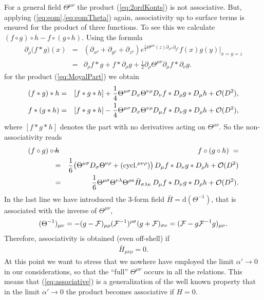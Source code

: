 \documentclass[a4paper,12pt]{article}
\newcommand {\ud} {\mathrm{d}}
\newcommand {\cF} {{\cal F}}
\newcommand {\cO}{{\cal O}}
\newcommand {\Back}{\!\!\!\!\!}
\begin{document}
For a general field $\Theta^{\mu\nu}$ the product (\ref{eq:2ordKonts})
is not associative. But, applying (\ref{eq:eom},\ref{eq:eomTheta})  again,
associativity up to surface terms is ensured for the product of three 
functions. To see this we calculate $(f\circ g)\circ h-f\circ (g\circ h)$.
%
Using the formula 
\begin{eqnarray}
  \label{eq:diffMoyal}
  \partial_\rho \bigl(f*g\bigr)(x) &=& 
  (\partial_{x^\rho} + \partial_{y^\rho} + \partial_{z^\rho})
  e^{\frac i2 \Theta^{\mu\nu}(z) \partial_{x^\mu}\partial_{y^\nu}} 
            f(x) g(y)\Bigr\vert_{x=y=z} \nonumber\\
  &=& \partial_\rho f * g + f * \partial_\rho g + 
  \frac i2 \partial_\rho \Theta^{\mu\nu}\partial_\mu f * \partial_\nu g.
\end{eqnarray}
for the product (\ref{eq:MoyalPart}) we obtain
\begin{eqnarray}
  \label{starnonassoc}
  (f * g) * h &=& [f*g*h] + 
                \frac 14 \Theta^{\mu\sigma} D_\sigma \Theta^{\nu\rho}
                D_\nu f * D_\rho g * D_\mu h + \cO(D^2),\nonumber\\
  f * (g * h) &=& [f*g*h] - 
                \frac 14 \Theta^{\mu\sigma} D_\sigma \Theta^{\nu\rho}
                D_\mu f * D_\nu g * D_\rho h + \cO(D^2),
\end{eqnarray}
where $[f*g*h]$ denotes the part with no derivatives acting on 
$\Theta^{\mu\nu}$. So the non-associativity reads
\begin{eqnarray}
  \label{eq:nonassoc}
  (f \circ g) \circ h \Back&-&\Back f \circ (g \circ h) \; = \nonumber\\
  &=& \frac{1}{6} \bigl( \Theta^{\mu\sigma}  D_\sigma \Theta^{\nu\rho} +  
     (\textrm{cycl.}{}^{\mu\nu\rho}) \bigr) \, %
     D_\mu f * D_\nu g * D_\rho h + \cO(D^2) \nonumber\\
  &=& \frac{1}{6} 
     \Theta^{\mu\sigma} \Theta^{\nu\lambda} \Theta^{\rho\kappa}
     \bar H_{\sigma\lambda\kappa} \, 
     D_\mu f * D_\nu g * D_\rho h + \cO(D^2) .
\end{eqnarray}
In the last line we have introduced the 3-form field
$\bar H = \ud (\Theta^{-1})$, that is associated with the inverse of
$\Theta^{\mu\nu}$,
\begin{eqnarray}
  \label{eq:invTheta}
  (\Theta^{-1})_{\mu\nu} = -(g - \cF)_{\mu\rho} (\cF^{-1})^{\rho\sigma}
                              (g + \cF)_{\sigma\nu} 
                            = (\cF - g \cF^{-1} g)_{\mu\nu} .
\end{eqnarray}
Therefore, associativity is obtained (even off-shell) if
\begin{eqnarray}
  \label{eq:associative}
  \bar H_{\mu\nu\rho} = 0 .
\end{eqnarray}
At this point we want to stress that we nowhere have employed the limit
$\alpha' \! \rightarrow \! 0$ in our considerations, so that the
``full'' $\Theta^{\mu\nu}$ occurs in all the relations.
This means that (\ref{eq:associative}) is a generalization of
the well known property that in the limit $\alpha' \! \rightarrow \! 0$
the product becomes associative if $H = 0$.
\end{document}
